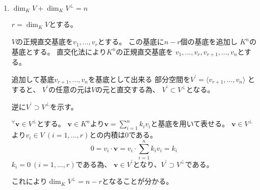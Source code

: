 \documentclass[12pt,b5paper]{ltjsarticle}
\begin{document}
\begin{enumerate}
\begin{enumerate}
       \item
            $\dim_{K}V + \dim_{K}V^{\perp} =n$

            $r=\dim_{K}V$とする。
            
            $V$の正規直交基底を$v_1,\dots,v_r$とする。
            この基底に$n-r$個の基底を追加し
            $K^n$の基底とする。
            直交化法により$K^n$の正規直交基底を
            $v_1,\dots,v_r,v_{r+1},\dots,v_n$とする。

            追加して基底$v_{r+1},\dots,v_n$を基底として出来る
            部分空間を$V^{\prime}=\langle v_{r+1},\dots,v_n \rangle$
            とすると、
            $V^{\prime}$の任意の元は$V$の元と直交する為、
            $V^{\prime} \subset V^{\perp}$となる。

            逆に$V^{\prime} \supset V^{\perp}$を示す。

            ${}^{\forall}\bm{v}\in V^{\perp}$とする。
            $\bm{v}\in K^{n}$より$\bm{v}=\sum_{i=1}^{n}k_iv_i$と基底を用いて表せる。
            $\bm{v}\in V^{\perp}$より$v_{i}\in V \ (i=1,\dots,r)$との内積は$0$である。
            \begin{equation}
             0=v_{i}\cdot\bm{v}=v_{i}\cdot\sum_{i=1}^{n}k_iv_i = k_i
            \end{equation}
            $k_i=0\ (i=1,\dots,r)$である為、
            $\bm{v}\in V^{\prime}$となり、$V^{\prime} \supset V^{\perp}$である。

            これにより$\dim_{K}V^{\perp}=n-r$となることが分かる。
      \end{enumerate}
\end{enumerate}
\end{document}

